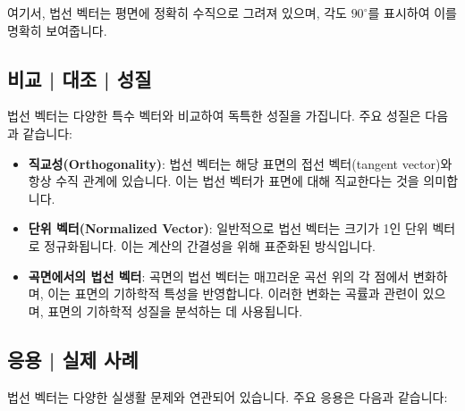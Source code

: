 \begin{center}
\end{center}

\noindent 여기서, 법선 벡터는 평면에 정확히 수직으로 그려져 있으며, 각도 \( 90^\circ \)를 표시하여 이를 명확히 보여줍니다.

\subsection{비교 | 대조 | 성질}
법선 벡터는 다양한 특수 벡터와 비교하여 독특한 성질을 가집니다. 주요 성질은 다음과 같습니다:

\begin{itemize}
  \item \textbf{직교성(Orthogonality)}: 법선 벡터는 해당 표면의 접선 벡터(tangent vector)와 항상 수직 관계에 있습니다. 이는 법선 벡터가 표면에 대해 직교한다는 것을 의미합니다.

  \item \textbf{단위 벡터(Normalized Vector)}: 일반적으로 법선 벡터는 크기가 1인 단위 벡터로 정규화됩니다. 이는 계산의 간결성을 위해 표준화된 방식입니다.

  \item \textbf{곡면에서의 법선 벡터}: 곡면의 법선 벡터는 매끄러운 곡선 위의 각 점에서 변화하며, 이는 표면의 기하학적 특성을 반영합니다. 이러한 변화는 곡률과 관련이 있으며, 표면의 기하학적 성질을 분석하는 데 사용됩니다.
\end{itemize}

\subsection{응용 | 실제 사례}
법선 벡터는 다양한 실생활 문제와 연관되어 있습니다. 주요 응용은 다음과 같습니다:

